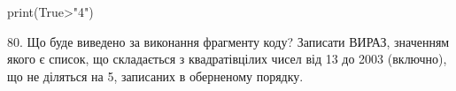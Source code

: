 \documentclass[11pt]{article}
\begin{document}
print(True>"4")

80. Що буде виведено за виконання фрагменту коду?
Записати ВИРАЗ, значенням якого є список, що складається з квадратівцілих чисел від 13 до 2003 (включно), що не діляться на 5, записаних в оберненому порядку.
















































































\newpage
\end{document}
